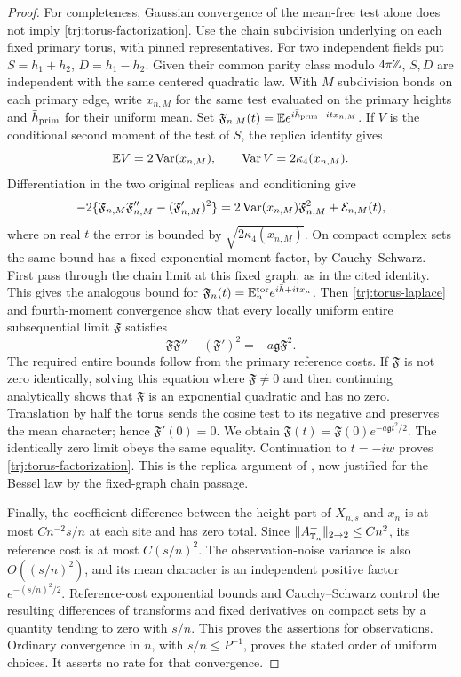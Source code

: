 \begin{proof}
For completeness, Gaussian convergence of the mean-free test alone
does not imply \eqref{trj:torus-factorization}.  Use the chain
subdivision underlying \cite[Lemma~2.2]{C} on each fixed primary torus,
with pinned representatives.  For two independent fields put
\(S=h_1+h_2\), \(D=h_1-h_2\).  Given their common parity class modulo
\(4\pi\mathbb Z\), \(S,D\) are independent with the same centered quadratic
law.  With \(M\) subdivision bonds on each primary edge, write
\(x_{n,M}\) for the same test evaluated on the primary heights and
\(\bar h_{\rm prim}\) for their uniform mean.  Set
\(\mathfrak F_{n,M}(t)=\mathbb E e^{i\bar h_{\rm prim}+itx_{n,M}}\).
If \(V\) is the conditional second moment of the test
of \(S\), the replica identity \cite[Equation~(2.12)]{C} gives
\[
 \mathbb E V=2\operatorname{Var}(x_{n,M}),\qquad \operatorname{Var} V=2\kappa_4(x_{n,M}).
\]
Differentiation in the two original replicas and conditioning give
\[
 -2\{\mathfrak F_{n,M}\mathfrak F_{n,M}''-(\mathfrak F_{n,M}')^2\}
       =2\operatorname{Var}(x_{n,M})\mathfrak F_{n,M}^2+\mathcal E_{n,M}(t),
\]
where on real \(t\) the error is bounded by
\(\sqrt{2\kappa_4(x_{n,M})}\).  On compact complex sets the same bound has
a fixed exponential-moment factor, by Cauchy--Schwarz.  First pass
through the chain limit at this fixed graph, as in the cited identity.
This gives the analogous bound for \(\mathfrak F_n(t)=\mathbb E_n^{\rm tor}
e^{i\bar h+itx_n}\).  Then \eqref{trj:torus-laplace} and fourth-moment convergence show that
every locally uniform entire subsequential limit \(\mathfrak F\) satisfies
\[
 \mathfrak F\mathfrak F''-(\mathfrak F')^2=-a\mathfrak g\mathfrak F^2.
\]
The required entire bounds follow from the primary reference costs.
If \(\mathfrak F\) is not zero identically, solving this equation where
\(\mathfrak F\ne0\) and then continuing analytically shows that
\(\mathfrak F\) is an exponential
quadratic and has no zero.  Translation by half the torus sends the
cosine test to its negative and preserves the mean character; hence
\(\mathfrak F'(0)=0\).  We obtain
\(\mathfrak F(t)=\mathfrak F(0)e^{-a\mathfrak g t^2/2}\).
The identically zero limit obeys the same equality.  Continuation to
\(t=-iw\) proves \eqref{trj:torus-factorization}.  This is the replica
argument of \cite[Lemma~10.1]{B}, now justified for the Bessel law by
the fixed-graph chain passage.

Finally, the coefficient difference between the height part of
\(X_{n,s}\) and \(x_n\) is at most \(Cn^{-2}s/n\) at each site and has
zero total.  Since \(\|A_{\mathbb T_n}^+\|_{2\to2}\le Cn^2\), its reference
cost is at most \(C(s/n)^2\).  The observation-noise variance is also
\(O((s/n)^2)\), and its mean character is an independent positive
factor \(e^{-(s/n)^2/2}\).  Reference-cost exponential bounds and
Cauchy--Schwarz control the resulting differences of transforms and
fixed derivatives on compact sets by a quantity tending to zero with
\(s/n\).  This proves the assertions for observations.  Ordinary
convergence in \(n\), with \(s/n\le P^{-1}\), proves the stated order
of uniform choices.  It asserts no rate for that convergence.
\end{proof}

